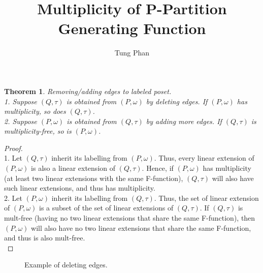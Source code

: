 \documentclass[reqno]{amsart}
\title{Multiplicity of P-Partition Generating Function}
\author{Tung Phan}
\newtheorem{theorem}{Theorem}
\begin{document}
\maketitle

\begin{theorem} Removing/adding edges to labeled poset.\\
1. Suppose $(Q, \tau)$ is obtained from $(P, \omega)$ by deleting edges. If $(P, \omega)$ has multiplicity, so does $(Q, \tau)$.\\
2. Suppose $(P, \omega)$ is obtained from $(Q, \tau)$ by adding more edges. If $(Q, \tau)$ is multiplicity-free, so is $(P, \omega)$.
\end{theorem}
\begin{proof} \ \\
1. Let $(Q, \tau)$ inherit its labelling from $(P, \omega)$. Thus, every linear extension of $(P,\omega)$ is also a linear extension of $(Q, \tau)$. Hence, if $(P, \omega)$ has multiplicity (at least two linear extensions with the same F-function), $(Q, \tau)$ will also have such linear extensions, and thus has multiplicity. \\
2. Let $(P, \omega)$ inherit its labelling from $(Q, \tau)$. Thus, the set of linear extension of $(P, \omega)$ is a subset of the set of linear extensions of $(Q, \tau)$. If $(Q, \tau)$ is mult-free (having no two linear extensions that share the same F-function), then $(P,\omega)$ will also have no two linear extensions that share the same F-function, and thus is also mult-free.\\
\end{proof}

\begin{figure}[htbp]
\begin{center}
\caption{Example of deleting edges.}
\label{fig:popartitions}
\end{center}
\end{figure}
\end{document}
